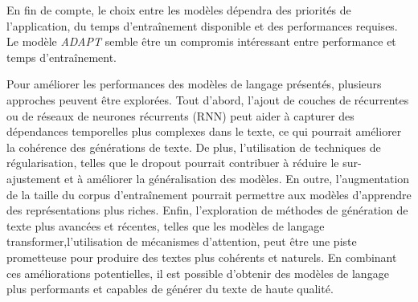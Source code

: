 \documentclass[a4paper]{article}
\begin{document}
En fin de compte, le choix entre les modèles dépendra des priorités de l'application, du temps d'entraînement disponible et des performances requises. Le modèle \textit{ADAPT} semble être un compromis intéressant entre performance et temps d'entraînement.

Pour améliorer les performances des modèles de langage présentés, plusieurs approches peuvent être explorées. Tout d'abord, l'ajout de couches de récurrentes ou de réseaux de neurones récurrents (RNN) peut aider à capturer des dépendances temporelles plus complexes dans le texte, ce qui pourrait améliorer la cohérence des générations de texte. De plus, l'utilisation de techniques de régularisation, telles que le dropout pourrait contribuer à réduire le sur-ajustement et à améliorer la généralisation des modèles. En outre, l'augmentation de la taille du corpus d'entraînement pourrait permettre aux modèles d'apprendre des représentations plus riches. Enfin, l'exploration de méthodes de génération de texte plus avancées et récentes, telles que les modèles de langage transformer,l'utilisation de mécanismes d'attention, peut être une piste prometteuse pour produire des textes plus cohérents et naturels. En combinant ces améliorations potentielles, il est possible d'obtenir des modèles de langage plus performants et capables de générer du texte de haute qualité.




\newpage

\printbibliography
\end{document}
